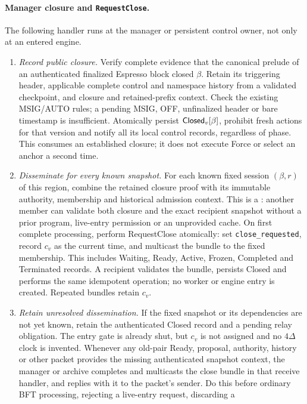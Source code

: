 \paragraph{Manager closure and \texttt{RequestClose}.}
The following handler runs at the manager or persistent control owner,
not only at an entered engine.
\begin{enumerate}[label=(\roman*),itemsep=2pt]
\item \emph{Record public closure.} Verify complete evidence that the
canonical prelude of an authenticated finalized Espresso block closed
$\beta$. Retain its triggering header, applicable complete control and
namespace history from a validated checkpoint, and closure and
retained-prefix context. Check the existing MSIG/AUTO rules; a pending
MSIG, OFF, unfinalized header or bare timestamp is insufficient.
Atomically persist $\mathsf{Closed}_v[\beta]$, prohibit fresh actions for
that version and notify all its local control records, regardless of
phase. This consumes an established closure; it does not execute Force
or select an anchor a second time.
\item \emph{Disseminate for every known snapshot.} For each known fixed
session $(\beta,r)$ of this region, combine the retained closure proof
with its immutable authority, membership and historical admission
context. This is a : another member can
validate both closure and the exact recipient snapshot without a prior
program, live-entry permission or an unprovided cache. On first complete
processing, perform RequestClose atomically: set
\texttt{close\_requested}, record $c_v$ as the current time, and multicast
the bundle to the fixed membership. This includes Waiting, Ready,
Active, Frozen, Completed and Terminated records. A recipient validates
the bundle, persists Closed and performs the same idempotent operation;
no worker or engine entry is created. Repeated bundles retain $c_v$.
\item \emph{Retain unresolved dissemination.} If the fixed snapshot or
its dependencies are not yet known, retain the authenticated Closed
record and a pending relay obligation. The entry gate is already shut,
but $c_v$ is not assigned and no $4\Delta$ clock is invented.
Whenever any old-pair Ready, proposal, authority, history or other packet
provides the missing authenticated snapshot context, the manager or
archive completes and multicasts the close bundle in that receive
handler, and replies with it to the packet's sender. Do this before
ordinary BFT processing, rejecting a live-entry request, discarding a

\end{enumerate}
